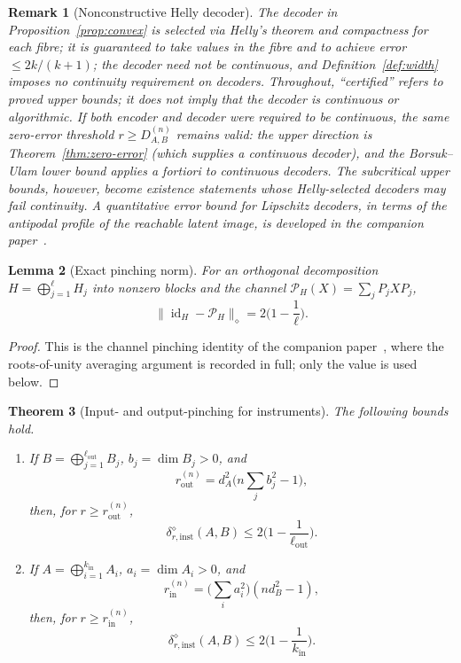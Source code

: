 \documentclass[11pt,a4paper]{article}
\newtheorem{theorem}{Theorem}[section]
\newtheorem{lemma}[theorem]{Lemma}
\newtheorem{remark}[theorem]{Remark}
\newcommand{\id}{\operatorname{id}}
\begin{document}
\begin{remark}[Nonconstructive Helly decoder]
\label{rem:nonconstructive}
The decoder in Proposition~\ref{prop:convex} is selected via Helly's theorem and compactness for each fibre; it is guaranteed to take values in the fibre and to achieve error $\le2k/(k+1)$; the decoder need not be continuous, and Definition~\ref{def:width} imposes no continuity requirement on decoders. Throughout, ``certified'' refers to proved upper bounds; it does not imply that the decoder is continuous or algorithmic. If both encoder and decoder were required to be continuous, the same zero-error threshold $r\ge D_{A,B}^{(n)}$ remains valid: the upper direction is Theorem~\ref{thm:zero-error} (which supplies a continuous decoder), and the Borsuk--Ulam lower bound applies a fortiori to continuous decoders. The subcritical upper bounds, however, become existence statements whose Helly-selected decoders may fail continuity. A quantitative error bound for Lipschitz decoders, in terms of the antipodal profile of the reachable latent image, is developed in the companion paper~\cite{CompanionChannels}.
\end{remark}

\begin{lemma}[Exact pinching norm]
\label{lem:pinching-norm}
For an orthogonal decomposition $H=\bigoplus_{j=1}^{\ell}H_j$ into nonzero blocks and the channel $\mathcal P_H(X)=\sum_jP_jXP_j$,
\[
\|\id_H-\mathcal P_H\|_\diamond=2\Big(1-\frac1\ell\Big).
\]
\end{lemma}

\begin{proof}
This is the channel pinching identity of the companion paper~\cite{CompanionChannels}, where the roots-of-unity averaging argument is recorded in full; only the value is used below.
\end{proof}

\begin{theorem}[Input- and output-pinching for instruments]
\label{thm:pinching}
The following bounds hold.
\begin{enumerate}[leftmargin=*,itemsep=2pt]
\item If $B=\bigoplus_{j=1}^{\ell_{\mathrm{out}}}B_j$, $b_j=\dim B_j>0$, and
\[
r_{\mathrm{out}}^{(n)}=d_A^2\Big(n\sum_jb_j^2-1\Big),
\]
then, for $r\ge r_{\mathrm{out}}^{(n)}$,
\[
\delta_{r,\mathrm{inst}}^{\diamond}(A,B)\le2\Big(1-\frac1{\ell_{\mathrm{out}}}\Big).
\]
\item If $A=\bigoplus_{i=1}^{k_{\mathrm{in}}}A_i$, $a_i=\dim A_i>0$, and
\[
r_{\mathrm{in}}^{(n)}=\Big(\sum_ia_i^2\Big)(nd_B^2-1),
\]
then, for $r\ge r_{\mathrm{in}}^{(n)}$,
\[
\delta_{r,\mathrm{inst}}^{\diamond}(A,B)\le2\Big(1-\frac1{k_{\mathrm{in}}}\Big).
\]
\end{enumerate}
\end{theorem}
\end{document}
